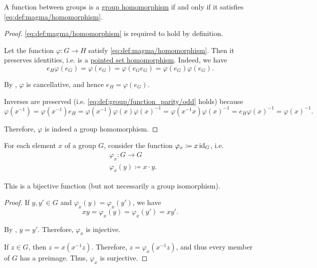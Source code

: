 \begin{proposition}\label{thm:group_homomorphism_single_condition}
  A function between groups is a \hyperref[def:group/homomorphism]{group homomorphism} if and only if it satisfies \eqref{eq:def:magma/homomorphism}.
\end{proposition}
\begin{proof}
  \SufficiencySubProof \eqref{eq:def:magma/homomorphism} is required to hold by definition.

  \NecessitySubProof Let the function \( \varphi: G \to H \) satisfy \eqref{eq:def:magma/homomorphism}. Then it preserves identities, i.e. is a \hyperref[rem:pointed_set/homomorphism]{pointed set homomorphism}. Indeed, we have
  \begin{equation*}
    e_H \varphi(e_G) = \varphi(e_G) = \varphi(e_G e_G) = \varphi(e_G) \varphi(e_G).
  \end{equation*}

  By , \( \varphi \) is cancellative, and hence \( e_H = \varphi(e_G) \).

  Inverses are preserved (i.e. \eqref{eq:def:group/function_parity/odd} holds) because
  \begin{equation*}
    \varphi(x^{-1})
    =
    \varphi(x^{-1}) e_H
    =
    \varphi(x^{-1}) \varphi(x) \varphi(x)^{-1}
    =
    \varphi(x^{-1} x) \varphi(x)^{-1}
    =
    e_H \varphi(x)^{-1}
    =
    \varphi(x)^{-1}.
  \end{equation*}

  Therefore, \( \varphi \) is indeed a group homomorphism.
\end{proof}

\begin{lemma}\label{thm:group_operation_induces_bijections}
  For each element \( x \) of a group \( G \), consider the function \( \varphi_x \coloneqq x \operatorname{id}_G \), i.e.
  \begin{equation*}
    \begin{aligned}
      &\varphi_x: G \to G \\
      &\varphi_x(y) \coloneqq x \cdot y.
    \end{aligned}
  \end{equation*}

  This is a bijective function (but not necessarily a group isomorphism).
\end{lemma}
\begin{proof}
   If \( y, y' \in G \) and \( \varphi_x(y) = \varphi_x(y') \), we have
  \begin{equation*}
    xy = \varphi_x(y) = \varphi_x(y') = xy'.
  \end{equation*}

  By , \( y = y' \). Therefore, \( \varphi_x \) is injective.

   If \( z \in G \), then \( z = x(x^{-1} z) \). Therefore, \( z = \varphi_x(x^{-1} z) \), and thus every member of \( G \) has a preimage. Thus, \( \varphi_x \) is surjective.
\end{proof}

